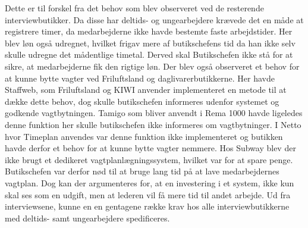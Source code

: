 Dette er til forskel fra det behov som blev observeret ved de resterende interviewbutikker. Da disse har deltids- og ungearbejdere krævede det en måde at registrere timer, da medarbejderne ikke havde bestemte faste arbejdstider. Her blev løn også udregnet, hvilket frigav mere af butikschefens tid da han ikke selv skulle udregne det mådentlige timetal. Derved skal Butikschefen ikke stå for at sikre, at medarbejderne fik den rigtige løn. Der blev også observeret et behov for at kunne bytte vagter ved Friluftsland og daglivarerbutikkerne. Her havde Staffweb, som Friluftsland og KIWI anvender implementeret en metode til at dække dette behov, dog skulle butikschefen informeres udenfor systemet og godkende vagtbytningen. Tamigo som bliver anvendt i Rema 1000 havde ligeledes denne funktion her skulle butikschefen ikke informeres om vagtbytninger. I Netto hvor Timeplan anvendes var denne funktion ikke implementeret og butikken havde derfor et behov for at kunne bytte vagter nemmere. Hos Subway blev der ikke brugt et dedikeret vagtplanlægningssystem, hvilket var for at spare penge. Butikschefen var derfor nød til at bruge lang tid på at lave medarbejdernes vagtplan. Dog kan der argumenteres for, at en investering i et system, ikke kun skal ses som en udgift, men at lederen vil få mere tid til andet arbejde. Ud fra interviewsene, kunne en en gentagene række krav hos alle interviewbutikkerne med deltids- samt ungearbejdere spedificeres. %




